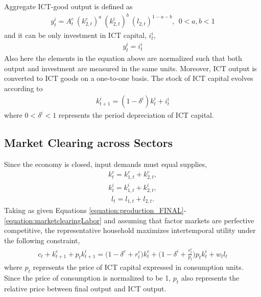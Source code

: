 \documentclass[12pt]{article}
\begin{document}
Aggregate ICT-good output is defined as
\begin{eqnarray}\label{equation:production_ICT_aggregate}
	y^i_t = A^c_t \ ( k^c_{2,t} )^a \ ( k^i_{2,t} )^b \ ( l_{2,t} )^{1-a-b}, \ \ 0 < a,b < 1
\end{eqnarray}
and it can be only investment in ICT capital, $i^i_t$,
\begin{eqnarray}\label{equation:resourceICT}
y^i_t = i^i_t
\end{eqnarray}
Also here the elements in the equation above are normalized such that both output and investment are measured in the same units. Moreover, ICT output is converted to ICT goods on a one-to-one basis. The stock of ICT capital evolves according to
\begin{eqnarray}\label{equation:LOM_ICT}
k^i_{t+1} = (1 - \delta^i) k^i_t + i^i_t
\end{eqnarray}
where $0 < \delta^i < 1$ represents the period depreciation of ICT capital.

\subsection{Market Clearing across Sectors}

Since the economy is closed, input demands must equal supplies,
\begin{eqnarray}\label{equation:marketclearingHard}
k^c_t = k^c_{1,t} + k^c_{2,t},
\end{eqnarray}
\begin{eqnarray}\label{equation:marketclearingICT}
k^i_t = k^i_{1,t} + k^i_{2,t}, 
\end{eqnarray}
\begin{eqnarray}\label{equation:marketclearingLabor}
l_t = l_{1,t} + l_{2,t}.
\end{eqnarray}
Taking as given Equations \ref{equation:production_FINAL}-\ref{equation:marketclearingLabor} and assuming that factor markets are perfective competitive, the representative household maximizes intertemporal utility under the following constraint,
\begin{eqnarray}\label{equation:resourceHH}
	c_t + k^c_{t+1} +p_t k^i_{t+1} = \bigg( 1 - \delta^c + r^c_t \bigg) k^c_t + \bigg( 1 - \delta^i + \frac{r^i_t}{p_t} \bigg) p_t k^i_t + w_t l_t	
\end{eqnarray}
where $p_t$ represents the price of ICT capital expressed in consumption units. Since the price of consumption is normalized to be 1, $p_t$ also represents the relative price between final output and ICT output.
\end{document}
